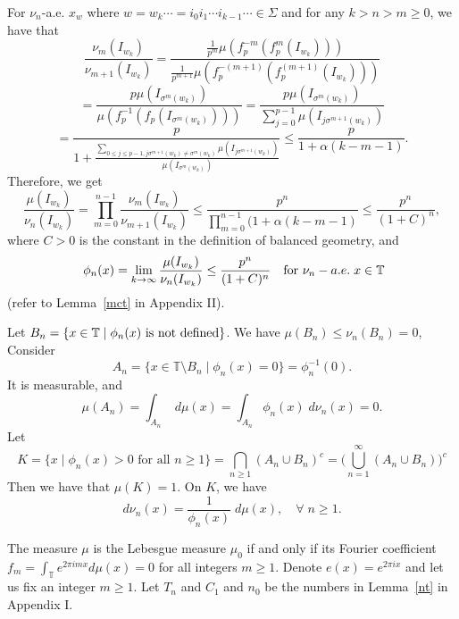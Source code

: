 \documentclass[11pt]{amsart}
\theoremstyle{definition}
\def\m{\mu}
\def\n{\nu}
\def\T{\mathbb{T}}
\def\S{\Sigma}
\def\s{\sigma}
\def\s{\sigma}
\begin{document}
For $\nu_{n}$-a.e. $x_{w}$ where $w=w_{k}\cdots =i_{0}i_{1}\cdots i_{k-1}\cdots \in \S$ and for any $k>n>m\geq 0$, we have that
$$
\frac{\nu_{m} (I_{w_{k}})}{\nu_{m+1} (I_{w_{k}})}= \frac{\frac{1}{p^{m}} \m (f_{p}^{-m}(f_{p}^m(I_{w_{k}})))}{\frac{1}{p^{m+1}} \m (f_{p}^{-(m+1)}(f_{p}^{(m+1)}(I_{w_{k}})))}
$$
$$
=\frac{p\m (I_{\s^{m}(w_{k})})}{\m (f_{p}^{-1}(f_{p}(I_{\s^{m}(w_{k})})))}
=\frac{p \m (I_{\s^{m}(w_{k})})}{\sum_{j=0}^{p-1} \m (I_{j\s^{m+1} (w_{k})})}
$$
$$
=\frac{p}{1+\frac{\sum_{0\leq j\leq p-1, j\s^{m+1}(w_{k}) \not= \s^{m}(w_{k})} \m (I_{j\s^{m+1}(w_{k})})}{\m (I_{\s^{m}(w_{k})})}}
\leq \frac{p}{1+\alpha (k-m-1)}.
$$
Therefore, we get 
$$
\frac{\m (I_{w_{k}})}{\nu_{n} (I_{w_{k}})} =\prod_{m=0}^{n-1} \frac{\nu_{m} (I_{w_{k}})}{\nu_{m+1} (I_{w_{k}})}\leq \frac{p^{n}}{\prod_{m=0}^{n-1}(1+\alpha (k-m-1)} \leq \frac{p^{n}}{(1+C)^{n}},
$$
where $C>0$ is the constant in the definition of balanced geometry,
and
\begin{equation}~\label{bd}
\phi_{n} (x) =\lim_{k\to \infty} \frac{\m(I_{w_{k}})}{\nu_{n} (I_{w_{k}})} \leq \frac{p^{n}}{(1+C)^{n}} \quad \hbox{for $\nu_{n}-a.e. \; x\in \mathbb{T}$}
\end{equation}
(refer to Lemma~\ref{mct} in Appendix II).

Let $B_{n}=\{ x\in \T\;|\; \phi_{n}(x) \hbox{ is not defined}\}$. We have $\m(B_{n})\leq \nu_{n} (B_{n})=0$, Consider 
$$
A_{n} = \{ x\in \T\setminus B_{n}\;|\; \phi_{n}(x) =0\} =\phi_{n}^{-1} (0).
$$
It is measurable, and 
$$
\m (A_{n}) =\int_{A_{n}} \; d\m (x) = \int_{A_{n}} \phi_{n}(x) \; d\n_n (x)=0.
$$
Let  
$$
K=\{x\;|\; \phi_n(x)>0\mbox{ for all }n\geq1\} =\bigcap_{n\geq 1} (A_{n}\cup B_{n})^{c} = \Big( \bigcup_{n=1}^{\infty} (A_{n}\cup B_{n}) \Big)^{c}
$$
Then we have that $\m (K)=1$. 
On $K$, we have 
$$
d\n_n(x)=\frac{1}{\phi_n(x)}\;d\m (x), \quad \forall\; n\geq 1.
$$

The measure $\mu$ is the Lebesgue measure $\mu_{0}$ if and only if its Fourier coefficient $f_{m}=\int_{\T} e^{2\pi i m x} d\m (x)=0$ for all integers $m\geq 1$. Denote $e(x) =e^{2\pi i x}$ and let us fix an integer $m\geq 1$. Let $T_{n}$ and $C_{1}$ and $n_{0}$ be the numbers in Lemma~\ref{nt} in Appendix I.
\end{document}
